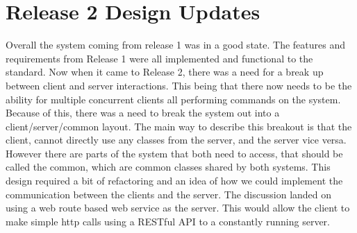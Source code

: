 \documentclass[12pt]{report}
\begin{document}
    \section*{Release 2 Design Updates}\label{sec:release2DesignUpdates}

    \indent
    Overall the system coming from release 1 was in a good state.
    The features and requirements from Release 1 were all implemented and functional to the standard.
    Now when it came to Release 2, there was a need for a break up between client and server interactions.
    This being that there now needs to be the ability for multiple concurrent clients all performing commands on the system.
    Because of this, there was a need to break the system out into a client/server/common layout.
    \newline
    \indent
    The main way to describe this breakout is that the client, cannot directly use any classes from the server, and the server vice versa.
    However there are parts of the system that both need to access, that should be called the common, which are common classes shared by both systems.
    \newline
    \indent
    This design required a bit of refactoring and an idea of how we could implement the communication between the clients and the server.
    The discussion landed on using a web route based web service as the server.
    This would allow the client to make simple http calls using a RESTful API to a constantly running server.

    \begin{center}
    \end{center}
\end{document}
